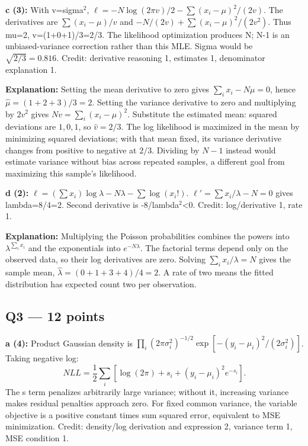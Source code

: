 \documentclass[11pt]{article}
\begin{document}
\textbf{c (3):} With v=sigma\ensuremath{{}^2}, $\ell=-N\log(2\pi v)/2-\sum(x_i-\mu)^2/(2v)$. The derivatives are $\sum(x_i-\mu)/v$ and $-N/(2v)+\sum(x_i-\mu)^2/(2v^2)$. Thus mu=2, v=(1+0+1)/\allowbreak{}3=2/\allowbreak{}3. The likelihood optimization produces N; N-1 is an unbiased-variance correction rather than this MLE. Sigma would be $\sqrt{2/3}=0.816$. Credit: derivative reasoning 1, estimates 1, denominator explanation 1.

\textbf{Explanation:} Setting the mean derivative to zero gives $\sum_i x_i-N\mu=0$, hence $\hat\mu=(1+2+3)/3=2$. Setting the variance derivative to zero and multiplying by $2v^2$ gives $Nv=\sum_i(x_i-\mu)^2$. Substitute the estimated mean: squared deviations are $1,0,1$, so $\hat v=2/3$. The log likelihood is maximized in the mean by minimizing squared deviations; with that mean fixed, its variance derivative changes from positive to negative at $2/3$. Dividing by $N-1$ instead would estimate variance without bias across repeated samples, a different goal from maximizing this sample's likelihood.

\textbf{d (2):} $\ell=(\sum x_i)\log\lambda-N\lambda-\sum\log(x_i!)$. $\ell'=\sum x_i/\lambda-N=0$ gives lambda=8/\allowbreak{}4=2. Second derivative is -8/\allowbreak{}lambda\ensuremath{{}^2}<0. Credit: log/\allowbreak{}derivative 1, rate 1.

\textbf{Explanation:} Multiplying the Poisson probabilities combines the powers into $\lambda^{\sum_i x_i}$ and the exponentials into $e^{-N\lambda}$. The factorial terms depend only on the observed data, so their log derivatives are zero. Solving $\sum_i x_i/\lambda=N$ gives the sample mean, $\hat\lambda=(0+1+3+4)/4=2$. A rate of two means the fitted distribution has expected count two per observation.


\subsection*{Q3 — 12 points}

\textbf{a (4):} Product Gaussian density is $\prod_i(2\pi\sigma_i^2)^{-1/2}\exp[-(y_i-\mu_i)^2/(2\sigma_i^2)]$. Taking negative log:
\[
NLL=\frac12\sum_i[\log(2\pi)+s_i+(y_i-\mu_i)^2e^{-s_i}].
\]
The s term penalizes arbitrarily large variance; without it, increasing variance makes residual penalties approach zero. For fixed common variance, the variable objective is a positive constant times sum squared error, equivalent to MSE minimization. Credit: density/\allowbreak{}log derivation and expression 2, variance term 1, MSE condition 1.
\end{document}
